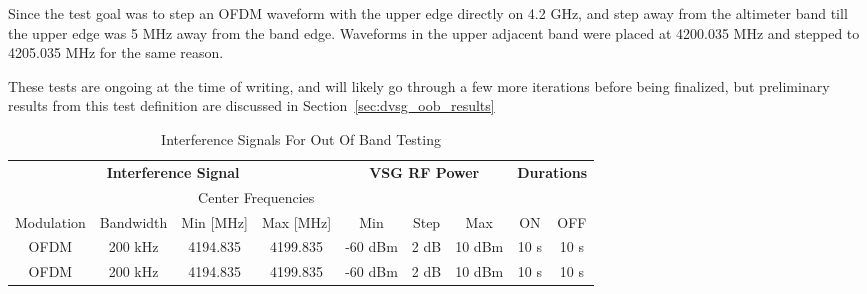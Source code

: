Since the test goal was to step an OFDM waveform with the upper edge directly on 4.2 GHz, and step away from the altimeter band till the upper edge was 5 MHz away from the band edge. Waveforms in the upper adjacent band were placed at 4200.035 MHz and stepped to 4205.035 MHz for the same reason.

These tests are ongoing at the time of writing, and will likely go through a few more iterations before being finalized, but preliminary results from this test definition are discussed in Section~\ref{sec:dvsg_oob_results}

\begin{table}[]
\begin{tabular}{cc|cc|ccc|cc}
\multicolumn{4}{c|}{\textbf{Interference Signal}}                                     & \multicolumn{3}{c|}{\textbf{VSG RF Power}} & \multicolumn{2}{c}{\textbf{Durations}} \\
                                &           & \multicolumn{2}{c|}{Center Frequencies} &                &            &              &                               &         \\
\multicolumn{1}{c|}{Modulation} & Bandwidth & Min {[}MHz{]}      & Max {[}MHz{]}      & Min            & Step       & Max          & \multicolumn{1}{c|}{ON}       & OFF     \\ \hline
\multicolumn{1}{c|}{OFDM}       & 200 kHz   & 4194.835           & 4199.835           & -60 dBm        & 2 dB       & 10 dBm       & \multicolumn{1}{c|}{10 s}     & 10 s    \\
\multicolumn{1}{c|}{OFDM}       & 200 kHz   & 4194.835           & 4199.835           & -60 dBm        & 2 dB       & 10 dBm       & \multicolumn{1}{c|}{10 s}     & 10 s   
\end{tabular}
\caption{Interference Signals For Out Of Band Testing}
\label{tab:oob}
\end{table}
